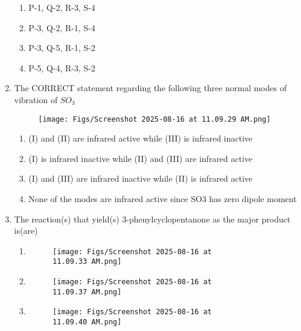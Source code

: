 \documentclass[12pt]{article}
\begin{document}
\begin{enumerate}
\begin{enumerate}
    \item P-1, Q-2, R-3, S-4
    \item P-3, Q-2, R-1, S-4
    \item P-3, Q-5, R-1, S-2
    \item P-5, Q-4, R-3, S-2
\end{enumerate}

\item The CORRECT statement regarding the following three normal modes of
vibration of $SO_3$ 


\begin{figure}[H]
\centering
\texttt{[image: Figs/Screenshot 2025-08-16 at 11.09.29 AM.png]}
\caption{}
\end{figure}

\begin{enumerate}
    \item (I) and (II) are infrared active while (III) is infrared inactive
    \item (I) is infrared inactive while (II) and (III) are infrared active
    \item (I) and (III) are infrared inactive while (II) is infrared active
    \item None of the modes are infrared active since SO3 has zero dipole moment
\end{enumerate}


\item The reaction(s) that yield(s) 3-phenylcyclopentanone as the major product is(are)


\begin{enumerate} 
    \item \begin{figure}[H]
\centering
\texttt{[image: Figs/Screenshot 2025-08-16 at 11.09.33 AM.png]}
\caption{}
\end{figure}

\item  \begin{figure}[H]
\centering
\texttt{[image: Figs/Screenshot 2025-08-16 at 11.09.37 AM.png]}
\caption{}
\end{figure}


\item  \begin{figure}[H]
\centering
\texttt{[image: Figs/Screenshot 2025-08-16 at 11.09.40 AM.png]}
\caption{}
\end{figure}


\end{enumerate}
\end{enumerate}
\end{document}

